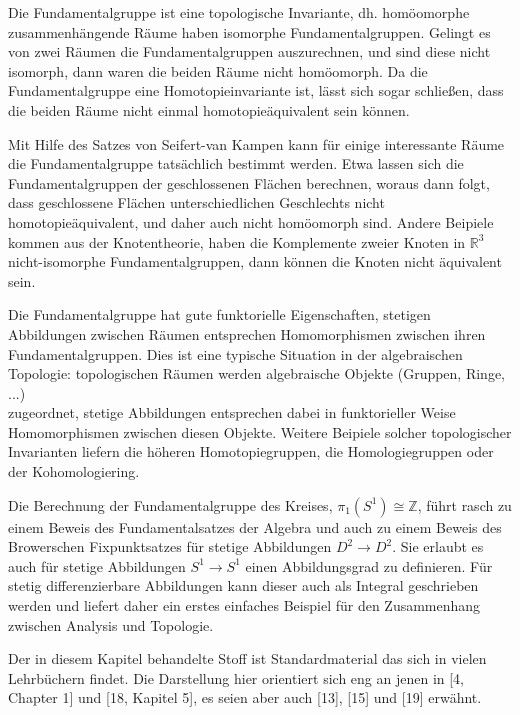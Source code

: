 \documentclass[10pt, letterpaper]{article}
\begin{document}
Die Fundamentalgruppe ist eine topologische Invariante, dh. homöomorphe zusammenhängende Räume haben isomorphe Fundamentalgruppen. Gelingt es von zwei Räumen die Fundamentalgruppen auszurechnen, und sind diese nicht isomorph, dann waren die beiden Räume nicht homöomorph. Da die Fundamentalgruppe eine Homotopieinvariante ist, lässt sich sogar schließen, dass die beiden Räume nicht einmal homotopieäquivalent sein können.

Mit Hilfe des Satzes von Seifert-van Kampen kann für einige interessante Räume die Fundamentalgruppe tatsächlich bestimmt werden. Etwa lassen sich die Fundamentalgruppen der geschlossenen Flächen berechnen, woraus dann folgt, dass geschlossene Flächen unterschiedlichen Geschlechts nicht homotopieäquivalent, und daher auch nicht homöomorph sind. Andere Beipiele kommen aus der Knotentheorie, haben die Komplemente zweier Knoten in $\mathbb{R}^{3}$ nicht-isomorphe Fundamentalgruppen, dann können die Knoten nicht äquivalent sein.

Die Fundamentalgruppe hat gute funktorielle Eigenschaften, stetigen Abbildungen zwischen Räumen entsprechen Homomorphismen zwischen ihren Fundamentalgruppen. Dies ist eine typische Situation in der algebraischen Topologie: topologischen Räumen werden algebraische Objekte (Gruppen, Ringe, ...)\\
zugeordnet, stetige Abbildungen entsprechen dabei in funktorieller Weise Homomorphismen zwischen diesen Objekte. Weitere Beipiele solcher topologischer Invarianten liefern die höheren Homotopiegruppen, die Homologiegruppen oder der Kohomologiering.

Die Berechnung der Fundamentalgruppe des Kreises, $\pi_{1}\left(S^{1}\right) \cong \mathbb{Z}$, führt rasch zu einem Beweis des Fundamentalsatzes der Algebra und auch zu einem Beweis des Browerschen Fixpunktsatzes für stetige Abbildungen $D^{2} \rightarrow D^{2}$. Sie erlaubt es auch für stetige Abbildungen $S^{1} \rightarrow S^{1}$ einen Abbildungsgrad zu definieren. Für stetig differenzierbare Abbildungen kann dieser auch als Integral geschrieben werden und liefert daher ein erstes einfaches Beispiel für den Zusammenhang zwischen Analysis und Topologie.

Der in diesem Kapitel behandelte Stoff ist Standardmaterial das sich in vielen Lehrbüchern findet. Die Darstellung hier orientiert sich eng an jenen in [4, Chapter 1] und [18, Kapitel 5], es seien aber auch [13], [15] und [19] erwähnt.
\end{document}

